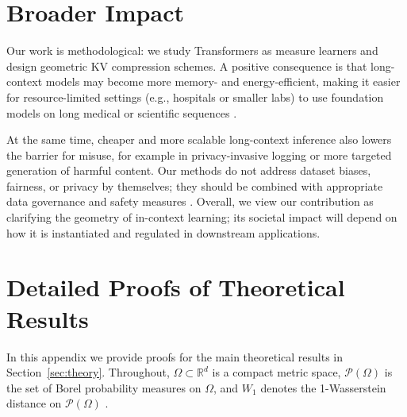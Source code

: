 \documentclass{article}
\theoremstyle{plain}
\theoremstyle{definition}
\theoremstyle{remark}
\newcommand{\OmegaSpace}{\Omega} %
\newcommand{\Pspace}{\mathcal{P}(\OmegaSpace)} %
\newcommand{\Wass}[1]{W_{#1}} %
\begin{document}
\section*{Broader Impact}
\label{sec:broader_impact}

Our work is methodological: we study Transformers as measure learners and design
geometric KV compression schemes. A positive consequence is that long-context
models may become more memory- and energy-efficient, making it easier for
resource-limited settings (e.g., hospitals or smaller labs) to use foundation
models on long medical or scientific sequences
\citep{moor2023foundation,setio2017validation,team2024gemini,ding2024longrope,gu2024mamba}.

At the same time, cheaper and more scalable long-context inference also lowers
the barrier for misuse, for example in privacy-invasive logging or more
targeted generation of harmful content. Our methods do not address dataset
biases, fairness, or privacy by themselves; they should be combined with
appropriate data governance and safety measures
\citep{vaswani2017attention,touvron2023llama}. Overall, we view our
contribution as clarifying the geometry of in-context learning; its societal
impact will depend on how it is instantiated and regulated in downstream
applications.




\newpage
\appendix
\onecolumn

\section{Detailed Proofs of Theoretical Results}
\label{app:proofs}

In this appendix we provide proofs for the main theoretical results in
Section~\ref{sec:theory}. Throughout, $\OmegaSpace \subset \mathbb{R}^d$ is a compact
metric space, $\Pspace$ is the set of Borel probability measures on $\OmegaSpace$, and
$\Wass{1}$ denotes the 1-Wasserstein distance on $\Pspace$
\citep{villani2009optimal}.
\end{document}
